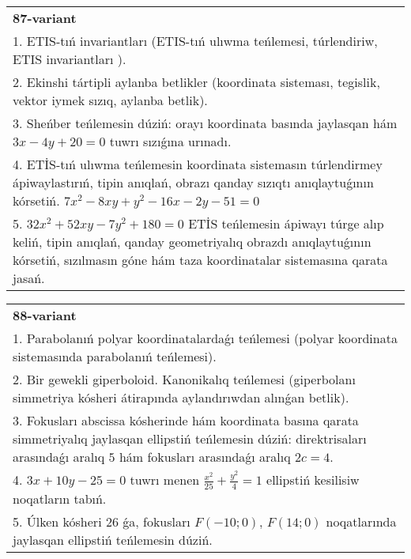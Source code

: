 \documentclass{article}
\begin{document}
\begin{tabular}{m{17cm}}
\textbf{87-variant}\\
1. ETIS-tıń invariantları (ETIS-tıń ulıwma teńlemesi, túrlendiriw, ETIS invariantları ).\\

2. Ekinshi tártipli aylanba betlikler (koordinata sisteması, tegislik, vektor iymek sızıq, aylanba betlik).\\

3. Sheńber teńlemesin dúziń: orayı koordinata basında jaylasqan hám $3 x-4 y+20=0$ tuwrı sızıǵına urınadı.\\

4. ETİS-tıń ulıwma teńlemesin koordinata sistemasın túrlendirmey ápiwaylastırıń, tipin anıqlań, obrazı qanday sızıqtı anıqlaytuǵının kórsetiń. $7x^{2} - 8xy + y^{2} - 16x - 2y - 51 = 0$  \\

5. $32x^{2} + 52xy - 7y^{2} + 180 = 0$ ETİS teńlemesin ápiwayı túrge alıp keliń, tipin anıqlań, qanday geometriyalıq obrazdı anıqlaytuǵının kórsetiń, sızılmasın góne hám taza koordinatalar sistemasına qarata jasań.  
\end{tabular}
\vspace{1cm}


\begin{tabular}{m{17cm}}
\textbf{88-variant}\\
1. Parabolanıń polyar koordinatalardaǵı teńlemesi (polyar koordinata sistemasında parabolanıń teńlemesi).\\

2. Bir gewekli giperboloid. Kanonikalıq teńlemesi (giperbolanı simmetriya kósheri átirapında aylandırıwdan alınǵan betlik).\\

3. Fokusları abscissa kósherinde hám koordinata basına qarata simmetriyalıq jaylasqan ellipstiń teńlemesin dúziń: direktrisaları arasındaǵı aralıq $5$ hám fokusları arasındaǵı aralıq $2 c=4$.\\

4. $3x + 10y - 25 = 0$ tuwrı menen $\frac{x^{2}}{25} + \frac{y^{2}}{4} = 1$ ellipstiń kesilisiw noqatların tabıń.\\

5. Úlken kósheri 26 ǵa, fokusları $F( - 10;0)$, $F(14;0)$ noqatlarında jaylasqan ellipstiń teńlemesin dúziń.  
\end{tabular}
\vspace{1cm}
\end{document}
